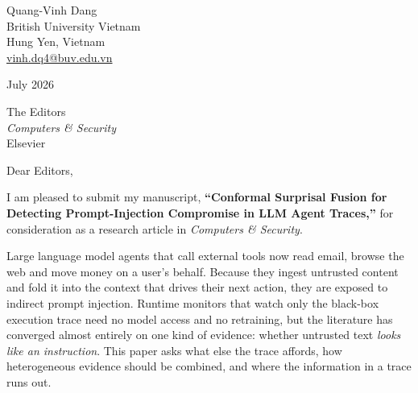 \documentclass[10pt]{article}
\begin{document}
\noindent
Quang-Vinh Dang\\
British University Vietnam\\
Hung Yen, Vietnam\\
\href{mailto:vinh.dq4@buv.edu.vn}{vinh.dq4@buv.edu.vn}

\vspace{0.7em}
 July 2026

\vspace{0.7em}
\noindent
The Editors\\
\emph{Computers \& Security}\\
Elsevier

\vspace{0.8em}
\noindent Dear Editors,

\vspace{0.6em}
I am pleased to submit my manuscript, \textbf{``Conformal Surprisal Fusion for
Detecting Prompt-Injection Compromise in LLM Agent Traces,''} for consideration as
a research article in \emph{Computers \& Security}.

Large language model agents that call external tools now read email, browse the
web and move money on a user's behalf. Because they ingest untrusted content and
fold it into the context that drives their next action, they are exposed to
indirect prompt injection. Runtime monitors that watch only the black-box execution
trace need no model access and no retraining, but the literature has converged
almost entirely on one kind of evidence: whether untrusted text \emph{looks like an
instruction}. This paper asks what else the trace affords, how heterogeneous
evidence should be combined, and where the information in a trace runs out.
\end{document}
